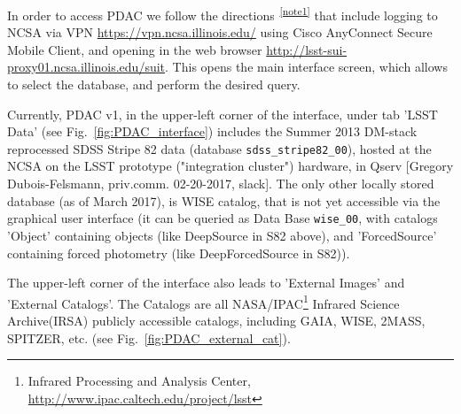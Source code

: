 \documentclass[DM,lsstdraft,toc]{lsstdoc}
\begin{document}
In order to access PDAC we 	follow the directions\textsuperscript{~\ref{note1}} that include logging to NCSA via VPN \url{https://vpn.ncsa.illinois.edu/} using Cisco AnyConnect Secure Mobile Client, and opening in the web browser \url{http://lsst-sui-proxy01.ncsa.illinois.edu/suit}. This opens the main interface screen, which allows to select the database, and perform the desired query.

Currently, PDAC v1,  in the upper-left corner of the interface, under tab 'LSST Data' (see Fig.~\ref{fig:PDAC_interface}) includes the Summer 2013 DM-stack reprocessed SDSS Stripe 82 data (database \verb|sdss_stripe82_00|), hosted at the NCSA on the LSST prototype ("integration cluster") hardware, in Qserv [Gregory Dubois-Felsmann, priv.comm. 02-20-2017, slack].  The only other locally stored database (as of March 2017), is  WISE catalog, that is not yet accessible via the graphical user interface (it can be queried as Data Base \verb|wise_00|, with catalogs 'Object' containing objects (like DeepSource in S82 above), and 'ForcedSource' containing forced photometry (like DeepForcedSource in S82)).


The upper-left corner of the interface also leads to 'External Images' and 'External Catalogs'. The Catalogs are all NASA/IPAC\footnote{Infrared Processing and Analysis Center, \url{http://www.ipac.caltech.edu/project/lsst}}  Infrared Science Archive(IRSA) publicly accessible catalogs, including GAIA, WISE, 2MASS, SPITZER, etc. (see Fig.~\ref{fig:PDAC_external_cat}).
\end{document}
